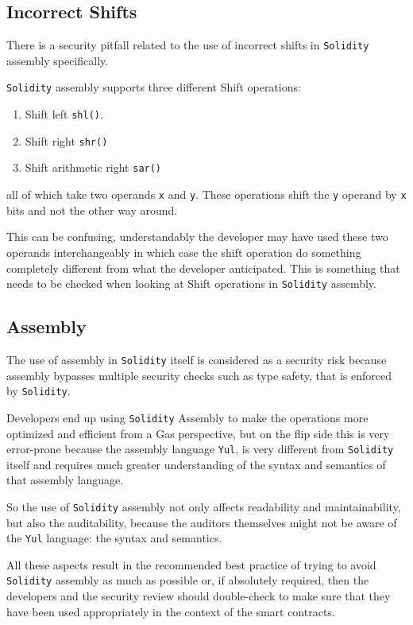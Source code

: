\subsection{Incorrect Shifts}\label{incorrect-shifts}

There is a security pitfall related to the use of incorrect shifts in
\texttt{Solidity} assembly specifically.

\texttt{Solidity} assembly supports three different Shift operations:

\begin{enumerate}
\def\labelenumi{\arabic{enumi}.}
\tightlist
\item
  Shift left \texttt{shl()}.
\item
  Shift right \texttt{shr()}
\item
  Shift arithmetic right \texttt{sar()}
\end{enumerate}

all of which take two operands \texttt{x} and \texttt{y}. These
operations shift the \texttt{y} operand by \texttt{x} bits and not the
other way around.

This can be confusing, understandably the developer may have used these
two operands interchangeably in which case the shift operation do
something completely different from what the developer anticipated. This
is something that needs to be checked when looking at Shift operations
in \texttt{Solidity} assembly.

\subsection{Assembly}\label{assembly}

The use of assembly in \texttt{Solidity} itself is considered as a
security risk because assembly bypasses multiple security checks such as
type safety, that is enforced by \texttt{Solidity}.

Developers end up using \texttt{Solidity} Assembly to make the
operations more optimized and efficient from a Gas perspective, but on
the flip side this is very error-prone because the assembly language
\texttt{Yul}, is very different from \texttt{Solidity} itself and
requires much greater understanding of the syntax and semantics of that
assembly language.

So the use of \texttt{Solidity} assembly not only affects readability
and maintainability, but also the auditability, because the auditors
themselves might not be aware of the \texttt{Yul} language: the syntax
and semantics.

All these aspects result in the recommended best practice of trying to
avoid \texttt{Solidity} assembly as much as possible or, if absolutely
required, then the developers and the security review should
double-check to make sure that they have been used appropriately in the
context of the smart contracts.

